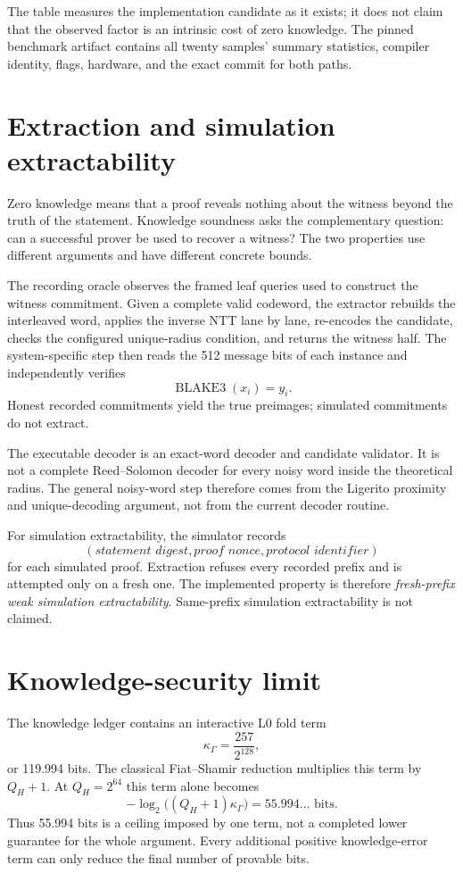 \documentclass[11pt]{article}
\theoremstyle{definition}
\begin{document}
The table measures the implementation candidate as it exists; it does not claim
that the observed factor is an intrinsic cost of zero knowledge.  The pinned
benchmark artifact contains all twenty samples' summary statistics, compiler
identity, flags, hardware, and the exact commit for both paths.

\section{Extraction and simulation extractability}\label{sec:extract}

Zero knowledge means that a proof reveals nothing about the witness beyond the
truth of the statement.  Knowledge soundness asks the complementary question:
can a successful prover be used to recover a witness?  The two properties use
different arguments and have different concrete bounds.

The recording oracle observes the framed leaf queries used to construct the
witness commitment.  Given a complete valid codeword, the extractor rebuilds
the interleaved word, applies the inverse NTT lane by lane, re-encodes the
candidate, checks the configured unique-radius condition, and returns the
witness half.  The system-specific step then reads the 512 message bits of
each instance and independently verifies
\[
  \operatorname{BLAKE3}(x_i)=y_i.
\]
Honest recorded commitments yield the true preimages; simulated commitments
do not extract.

The executable decoder is an exact-word decoder and candidate validator.  It
is not a complete Reed--Solomon decoder for every noisy word inside the
theoretical radius.  The general noisy-word step therefore comes from the
Ligerito proximity and unique-decoding argument, not from the current decoder
routine.

For simulation extractability, the simulator records
\[
  (\textit{statement digest},\textit{proof nonce},\textit{protocol identifier})
\]
for each simulated proof.  Extraction refuses every recorded prefix and is
attempted only on a fresh one.  The implemented property is therefore
\emph{fresh-prefix weak simulation extractability}.  Same-prefix simulation
extractability is not claimed.

\section{Knowledge-security limit}\label{sec:knowledge}

The knowledge ledger contains an interactive L0 fold term
\[
  \kappa_\Gamma=\frac{257}{2^{128}},
\]
or 119.994 bits.  The classical Fiat--Shamir reduction multiplies this term by
$Q_H+1$.  At $Q_H=2^{64}$ this term alone becomes
\[
  -\log_2\bigl((Q_H+1)\kappa_\Gamma\bigr)
  =55.994\ldots\text{ bits}.
\]
Thus 55.994 bits is a ceiling imposed by one term, not a completed lower
guarantee for the whole argument.  Every additional positive knowledge-error
term can only reduce the final number of provable bits.
\end{document}
